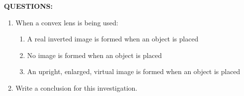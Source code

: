 {{\newpage
\textbf{QUESTIONS:}
\begin{enumerate}
\item When a convex lens is being used:

	\begin{enumerate}
	\item A real inverted image is formed when an object is placed \underline{\hspace{3cm}}
	\item No image is formed when an object is placed \underline{\hspace{3cm}}
	\item An upright, enlarged, virtual image is formed when an object is placed \underline{\hspace{3cm}}
	\end{enumerate}
	
\item Write a conclusion for this investigation.
\end{enumerate}
}
}

